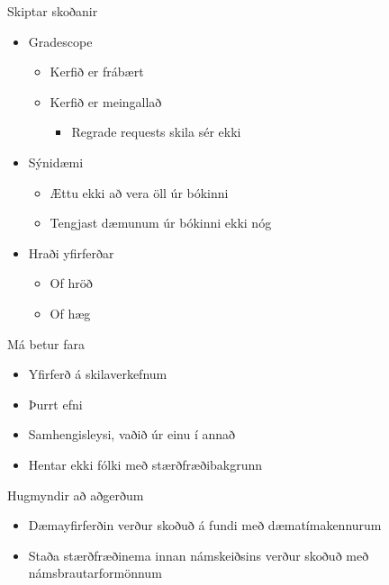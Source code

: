 \documentclass[handout]{beamer}
\begin{document}
\begin{frame}{Skiptar skoðanir}
    \begin{itemize}[<+->]
        \item Gradescope
        \begin{itemize}
            \item Kerfið er frábært
            \item Kerfið er meingallað
            \begin{itemize}
                \item Regrade requests skila sér ekki
            \end{itemize}
        \end{itemize}
        \item Sýnidæmi
        \begin{itemize}
            \item Ættu ekki að vera öll úr bókinni
            \item Tengjast dæmunum úr bókinni ekki nóg
        \end{itemize}
        \item Hraði yfirferðar
        \begin{itemize}
            \item Of hröð
            \item Of hæg
        \end{itemize}
    \end{itemize}
\end{frame}

\begin{frame}{Má betur fara}
    \begin{itemize}
        \item Yfirferð á skilaverkefnum
        \item Þurrt efni
        \item Samhengisleysi, vaðið úr einu í annað
        \item Hentar ekki fólki með stærðfræðibakgrunn
    \end{itemize}
\end{frame}

\begin{frame}{Hugmyndir að aðgerðum}
    \begin{itemize}
        \item Dæmayfirferðin verður skoðuð á fundi með dæmatímakennurum
        \item Staða stærðfræðinema innan námskeiðsins verður skoðuð með námsbrautarformönnum
    \end{itemize}
\end{frame}
\end{document}
